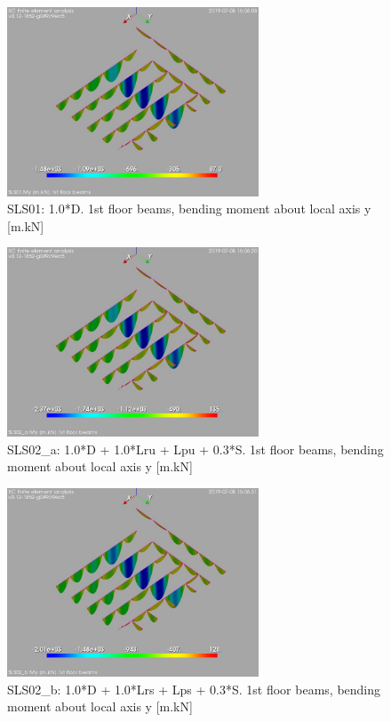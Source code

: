 \begin{figure}
\begin{center}
\includegraphics[width=75mm]{annex_res_columns/graphics/resSimplLC/SLS01beamsMy}
\caption{SLS01: 1.0*D. 1st floor beams, bending moment about local axis y [m.kN]}
\end{center}
\end{figure}

\begin{figure}
\begin{center}
\includegraphics[width=75mm]{annex_res_columns/graphics/resSimplLC/SLS02_abeamsMy}
\caption{SLS02\_a: 1.0*D + 1.0*Lru + Lpu + 0.3*S. 1st floor beams, bending moment about local axis y [m.kN]}
\end{center}
\end{figure}

\begin{figure}
\begin{center}
\includegraphics[width=75mm]{annex_res_columns/graphics/resSimplLC/SLS02_bbeamsMy}
\caption{SLS02\_b: 1.0*D + 1.0*Lrs + Lps + 0.3*S. 1st floor beams, bending moment about local axis y [m.kN]}
\end{center}
\end{figure}

